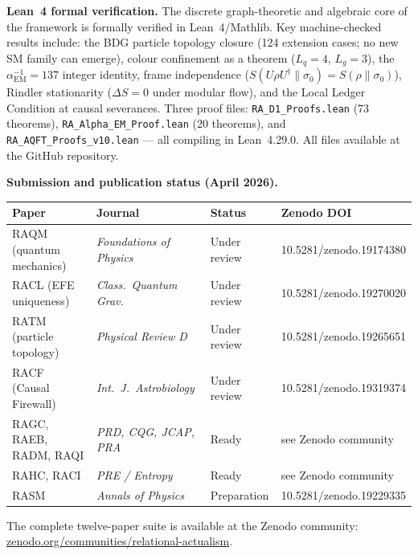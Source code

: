 \documentclass[11pt]{article}
\begin{document}
\bigskip

\noindent\textbf{Lean~4 formal verification.}
The discrete graph-theoretic and algebraic core of the framework is
formally verified in Lean~4/Mathlib.
Key machine-checked results include: the BDG particle topology closure
(124 extension cases; no new SM family can emerge), colour confinement
as a theorem ($L_q = 4$, $L_g = 3$), the $\alpha_{\mathrm{EM}}^{-1} = 137$
integer identity, frame independence
($S(U\rho U^\dagger\|\sigma_0) = S(\rho\|\sigma_0)$),
Rindler stationarity ($\Delta S = 0$ under modular flow),
and the Local Ledger Condition at causal severances.
Three proof files: \texttt{RA\_D1\_Proofs.lean} (73 theorems),
\texttt{RA\_Alpha\_EM\_Proof.lean} (20 theorems), and
\texttt{RA\_AQFT\_Proofs\_v10.lean} — all compiling in Lean~4.29.0.
All files available at the GitHub repository.

\bigskip

\noindent\textbf{Submission and publication status (April 2026).}

\begin{center}
\small
\begin{tabular}{p{4.4cm}lll}
\toprule
Paper & Journal & Status & Zenodo DOI \\
\midrule
RAQM (quantum mechanics) & \textit{Foundations of Physics} & Under review & 10.5281/zenodo.19174380 \\
RACL (EFE uniqueness) & \textit{Class.\ Quantum Grav.} & Under review & 10.5281/zenodo.19270020 \\
RATM (particle topology) & \textit{Physical Review D} & Under review & 10.5281/zenodo.19265651 \\
RACF (Causal Firewall) & \textit{Int.\ J.\ Astrobiology} & Under review & 10.5281/zenodo.19319374 \\
\midrule
RAGC, RAEB, RADM, RAQI & \textit{PRD, CQG, JCAP, PRA} & Ready & see Zenodo community \\
RAHC, RACI & \textit{PRE / Entropy} & Ready & see Zenodo community \\
RASM & \textit{Annals of Physics} & Preparation & 10.5281/zenodo.19229335 \\
\bottomrule
\end{tabular}
\end{center}

\medskip
\noindent The complete twelve-paper suite is
available at the Zenodo community:
\href{https://zenodo.org/communities/relational-actualism}{zenodo.org/communities/relational-actualism}.
\end{document}
